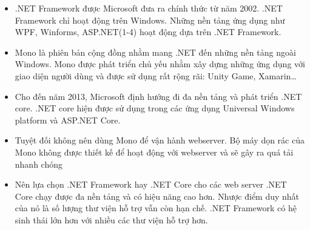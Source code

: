 \begin{itemize}
\item .NET Framework được Microsoft đưa ra chính thức từ năm 2002. .NET Framework chỉ hoạt động trên Windows. Những nền tảng ứng dụng như WPF, Winforms, ASP.NET(1-4) hoạt động dựa trên .NET Framework.
\item Mono là phiên bản cộng đồng nhằm mang .NET đến những nền tảng ngoài Windows. Mono được phát triển chủ yếu nhằm xây dựng những ứng dụng với giao diện người dùng và được sử dụng rất rộng rãi: Unity Game, Xamarin…
\item Cho đến năm 2013, Microsoft định hướng đi đa nền tảng và phát triển .NET core. .NET core hiện được sử dụng trong các ứng dụng Universal Windows platform và ASP.NET Core.
\item Tuyệt đối không nên dùng Mono để vận hành webserver. Bộ máy dọn rác của Mono không được thiết kế để hoạt động với webserver và sẽ gây ra quá tải nhanh chóng
\item Nên lựa chọn .NET Framework hay .NET Core cho các web server .NET Core chạy được đa nền tảng và có hiệu năng cao hơn. Nhược điểm duy nhất của nó là số lượng thư viện hỗ trợ vẫn còn hạn chế. .NET Framework có hệ sinh thái lớn hơn với nhiều các thư viện hỗ trợ hơn.
\end{itemize}


